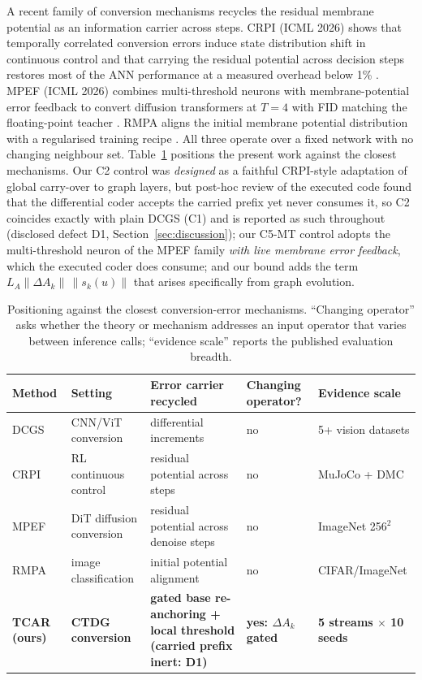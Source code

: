 \documentclass[preprint,12pt]{elsarticle}
\begin{document}
A recent family of conversion mechanisms recycles the residual membrane potential as an information carrier across steps. CRPI (ICML 2026) shows that temporally correlated conversion errors induce state distribution shift in continuous control and that carrying the residual potential across decision steps restores most of the ANN performance at a measured overhead below 1\% \cite{xu2026crpi}. MPEF (ICML 2026) combines multi-threshold neurons with membrane-potential error feedback to convert diffusion transformers at $T{=}4$ with FID matching the floating-point teacher \cite{fang2026mpef}. RMPA aligns the initial membrane potential distribution with a regularised training recipe \cite{chen2026rmpa}. All three operate over a fixed network with no changing neighbour set. Table~\ref{tab:positioning} positions the present work against the closest mechanisms. Our C2 control was \emph{designed} as a faithful CRPI-style adaptation of global carry-over to graph layers, but post-hoc review of the executed code found that the differential coder accepts the carried prefix yet never consumes it, so C2 coincides exactly with plain DCGS (C1) and is reported as such throughout (disclosed defect D1, Section~\ref{sec:discussion}); our C5-MT control adopts the multi-threshold neuron of the MPEF family \emph{with live membrane error feedback}, which the executed coder does consume; and our bound adds the term $L_A\|\Delta A_k\|\,\|s_k(u)\|$ that arises specifically from graph evolution.

\begin{table}[t]
\centering
\small
\caption{Positioning against the closest conversion-error mechanisms. ``Changing operator'' asks whether the theory or mechanism addresses an input operator that varies between inference calls; ``evidence scale'' reports the published evaluation breadth.}
\label{tab:positioning}
\begin{tabular}{lllll}
\toprule
Method & Setting & Error carrier recycled & Changing operator? & Evidence scale \\
\midrule
DCGS \cite{huang2025dcgs} & CNN/ViT conversion & differential increments & no & 5+ vision datasets \\
CRPI \cite{xu2026crpi} & RL continuous control & residual potential across steps & no & MuJoCo + DMC \\
MPEF \cite{fang2026mpef} & DiT diffusion conversion & residual potential across denoise steps & no & ImageNet 256$^2$ \\
RMPA \cite{chen2026rmpa} & image classification & initial potential alignment & no & CIFAR/ImageNet \\
\textbf{TCAR (ours)} & \textbf{CTDG conversion} & \textbf{gated base re-anchoring + local threshold (carried prefix inert: D1)} & \textbf{yes: $\Delta A_k$ gated} & \textbf{5 streams $\times$ 10 seeds} \\
\bottomrule
\end{tabular}
\end{table}
\end{document}
